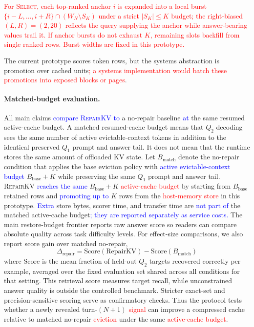 \documentclass{article}
\newcommand{\repairkv}{\textsc{RepairKV}}
\newcommand{\bbase}{\ensuremath{B_{\mathrm{base}}}}
\newcommand{\bmatch}{\ensuremath{B_{\mathrm{match}}}}
\begin{document}
\textcolor{red}{For \textsc{Select}, each top-ranked anchor $i$ is
expanded into a local burst $\{i{-}L,\dots,i{+}R\} \cap (W_N \setminus
S_K)$ under a strict $|S_K| \le K$ budget; the right-biased
$(L, R) = (2, 20)$ reflects the query supplying the anchor while
answer-bearing values trail it. If anchor bursts do not exhaust $K$,
remaining slots backfill from single ranked rows. Burst widths are
fixed in this prototype.}

The current prototype scores token rows, but the systems abstraction is
promotion over cached units\textcolor{red}{; a systems implementation
would batch these promotions into exposed blocks or pages}.

\paragraph{Matched-budget evaluation.}
All main claims \textcolor{blue}{compare \repairkv{} to} a no-repair baseline \textcolor{blue}{at} the same
resumed active-cache budget.
A matched resumed-cache budget means that $Q_2$ decoding sees
the same number of active evictable-context tokens in addition to the
identical preserved $Q_1$ prompt and answer tail.
It does not mean that the runtime stores the same amount of offloaded KV
state.
Let $\bmatch$ denote the no-repair condition that applies the base
eviction policy with \textcolor{blue}{active evictable-context budget} $\bbase + K$ while preserving the
same $Q_1$ prompt and answer tail.
\repairkv{} \textcolor{blue}{reaches the same} $\bbase+K$ \textcolor{red}{active-cache budget} by
starting from $\bbase$ retained rows and \textcolor{blue}{promoting up to} $K$ rows from the
\textcolor{red}{host-memory store} in this prototype.
\textcolor{blue}{Extra} store bytes, scorer time, and transfer time are \textcolor{blue}{not part of} the matched
active-cache budget\textcolor{blue}{; they are reported separately as service costs.}
The main restore-budget frontier reports raw answer score so readers can
compare absolute quality across task difficulty levels.
For effect-size comparisons, we also report score gain over matched
no-repair,
\begin{equation}
  \Delta_{\mathrm{repair}} =
  \mathrm{Score}(\mathrm{RepairKV}) - \mathrm{Score}(B_{\mathrm{match}})
\end{equation}
where $\mathrm{Score}$ is the mean fraction of held-out $Q_2$ targets
recovered correctly per example, averaged over the fixed evaluation set
shared across all conditions for that setting.
This retrieval score measures target recall, while unconstrained answer
quality is outside the controlled benchmark.
Stricter exact-set and precision-sensitive scoring serve as confirmatory
checks.
Thus the protocol tests whether a newly revealed turn-$(N{+}1)$
\textcolor{red}{signal} can improve a compressed cache relative to matched
no-repair \textcolor{red}{eviction} under the same \textcolor{red}{active-cache budget}.
\end{document}
